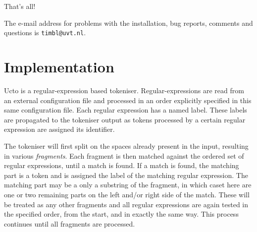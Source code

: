 \documentclass[a4paper,12pt]{report}
\begin{document}
That's all!

The e-mail address for problems with the installation, bug reports,
comments and questions is {\tt timbl@uvt.nl}.




\chapter{Implementation}

Ucto is a regular-expression based tokeniser. Regular-expressions are read from an external configuration file and processed in an order explicitly specified in this same configuration file. Each regular expression has a named label. These labels are propagated to the tokeniser output as tokens processed by a certain regular expression are assigned its identifier.

The tokeniser will first split on the spaces already present in the input, resulting in various \emph{fragments}. Each fragment is then matched against the ordered set of regular expressions, until a match is found. If a match is found, the matching part is a token and is assigned the label of the matching regular expression. The matching part may be a only a substring of the fragment, in which caset here are one or two remaining parts on the left and/or right side of the match. These will be treated as any other fragments and all regular expressions are again tested in the specified order, from the start, and in exactly the same way. This process continues until all fragments are processed. 
\end{document}
